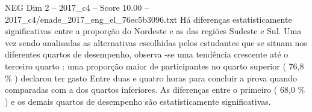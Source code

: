 \begin{textsample}{NEG Dim 2 – 2017\_c4 – Score 10.00 – 2017\_c4/enade\_2017\_eng\_el\_76ec5b3096.txt}
Há diferenças estatisticamente significativas entre a proporção do Nordeste e as das regiões Sudeste e Sul.
Uma vez sendo analisadas as alternativas escolhidas pelos estudantes que se situam nos diferentes quartos de desempenho, observa -se uma tendência crescente até o terceiro quarto : uma proporção maior de participantes no quarto superior ( 76,8 \% ) declarou ter gasto Entre duas e quatro horas para concluir a prova quando comparadas com a dos quartos inferiores.
As diferenças entre o primeiro ( 68,0 \% ) e os demais quartos de desempenho são estatisticamente significativas.

\end{textsample}
